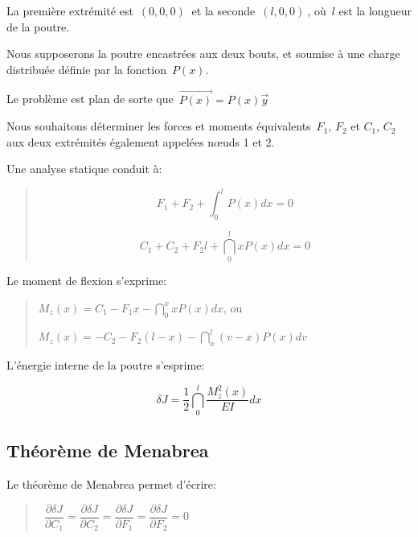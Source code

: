 La première extrémité est~$\left( 0,0,0\right)~$ et la seconde~$\left( l,0,0\right)~$, 
où~$l$ est la longueur de la poutre.

Nous supposerons la poutre encastrées aux deux bouts, et soumise à une charge
distribuée définie par la fonction~$P(x)$.

Le problème est plan de sorte que~$\overrightarrow{P(x)}
=P(x)\overrightarrow{y}$

Nous souhaitons déterminer les forces et moments équivalents~$F_1$, $F_2$ et
$C_1$, $C_2$ aux deux extrémités également appelées nœuds 1 et 2.

\medskip
Une analyse statique conduit à:

\begin{quotation}
\begin{equation}
  \label{staticF}
  F_1+F_2+\int_0^l P(x)dx=0 
\end{equation}

\begin{equation}
  \label{staticC}
  C_1+C_2+F_2l+\dint_0^l x P(x)dx=0 
\end{equation}
\end{quotation}


\medskip
Le moment de flexion s'exprime:

\begin{quotation}
$M_z(x)=C_1-F_1x-\dint_0^x x P(x)dx$, ou

$M_z(x)=-C_2-F_2(l-x)-\dint_x^l(v-x) P(x)dv$
\end{quotation}

\medskip
L'énergie interne de la poutre s'esprime:

\[
\delta J=\frac 12\dint_0^l\dfrac{M_z^2(x)}{EI}dx
\]

\medskip
\subsection{Théorème de Menabrea}

Le théorème de Menabrea permet d'écrire:

\begin{quotation}
 ~$\dfrac{\partial \delta J}{\partial C_1} =
  \dfrac{\partial \delta J}{\partial C_2} =
  \dfrac{\partial \delta J}{\partial F_1} =
  \dfrac{\partial \delta J}{\partial F_2} = 0$
\end{quotation}

